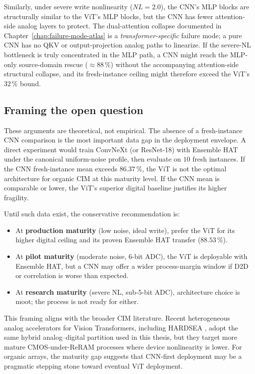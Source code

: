 Similarly, under severe write nonlinearity ($NL=2.0$), the CNN's MLP blocks are structurally similar to the ViT's MLP blocks, but the CNN has fewer attention-side analog layers to protect.  The dual-attention collapse documented in Chapter~\ref{chap:failure-mode-atlas} is a \emph{transformer-specific} failure mode; a pure CNN has no QKV or output-projection analog paths to linearize.  If the severe-NL bottleneck is truly concentrated in the MLP path, a CNN might reach the MLP-only source-domain rescue ($\approx 88\,\%$) without the accompanying attention-side structural collapse, and its fresh-instance ceiling might therefore exceed the ViT's $32\,\%$ bound.

\subsection{Framing the open question}

These arguments are theoretical, not empirical.  The absence of a fresh-instance CNN comparison is the most important data gap in the deployment envelope.  A direct experiment would train ConvNeXt (or ResNet-18) with Ensemble HAT under the canonical uniform-noise profile, then evaluate on $10$ fresh instances.  If the CNN fresh-instance mean exceeds $86.37\,\%$, the ViT is not the optimal architecture for organic CIM at this maturity level.  If the CNN mean is comparable or lower, the ViT's superior digital baseline justifies its higher fragility.

Until such data exist, the conservative recommendation is:
\begin{itemize}
    \item At \textbf{production maturity} (low noise, ideal write), prefer the ViT for its higher digital ceiling and its proven Ensemble HAT transfer ($88.53\,\%$).
    \item At \textbf{pilot maturity} (moderate noise, 6-bit ADC), the ViT is deployable with Ensemble HAT, but a CNN may offer a wider process-margin window if D2D or correlation is worse than expected.
    \item At \textbf{research maturity} (severe NL, sub-5-bit ADC), architecture choice is moot; the process is not ready for either.
\end{itemize}

This framing aligns with the broader CIM literature.  Recent heterogeneous analog accelerators for Vision Transformers, including HARDSEA \citep{lin2024hardsea}, adopt the same hybrid analog--digital partition used in this thesis, but they target more mature CMOS-under-ReRAM processes where device nonlinearity is lower.  For organic arrays, the maturity gap suggests that CNN-first deployment may be a pragmatic stepping stone toward eventual ViT deployment.


